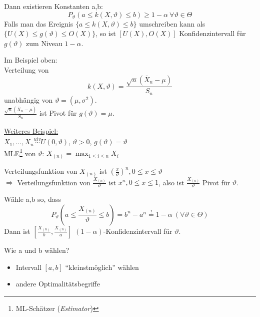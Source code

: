 \documentclass[a4paper,11pt,twoside,titlepage]{article}
\newcommand{\uiv}{\ensuremath{\stackrel{uiv}{\sim}}}
\begin{document}
Dann existieren Konstanten a,b:
\[P_\vartheta(a\leq k(X,\vartheta)\leq b)\geq1-\alpha\ \forall\vartheta\in\Theta\]
Falls man das Ereignis $\{a\leq k(X,\vartheta)\leq b\}$ umschreiben kann als $\{U(X)\leq g(\vartheta)\leq O(X)\}$, so ist $[U(X),O(X)]$ Konfidenzintervall für $g(\vartheta)$ zum Niveau $1-\alpha$.

Im Beispiel oben:\\
Verteilung von 
\[k(X,\vartheta)=\frac{\sqrt{n}(\bar X_n-\mu)}{S_n}\]
unabhängig von $\vartheta=(\mu,\sigma^2)$.\\
$\frac{\sqrt{n}(\bar X_n-\mu)}{S_n}$ ist Pivot für $g(\vartheta)=\mu$.

\underline{Weiteres Beispiel:}\\
$X_1,\ldots,X_n\uiv U(0,\vartheta)$, $\vartheta>0$, $g(\vartheta)=\vartheta$\\
MLE\footnote{ML-Schätzer (\textit{Estimator})} von $\vartheta$: $X_{(n)}=\max_{1\leq i\leq n}X_i$

Verteilungsfunktion von $X_{(n)}$ ist $(\frac{x}{\vartheta})^n, 0\leq x\leq \vartheta$\\
$\Rightarrow$ Verteilungsfunktion von $\frac{X_{(n)}}{\vartheta}$ ist $x^n, 0\leq x\leq 1$, also ist $\frac{X_{(n)}}{\vartheta}$ Pivot für $\vartheta$.

Wähle a,b so, dass 
\[P_\vartheta(a\leq \frac{X_{(n)}}{\vartheta}\leq b)=b^n-a^n\stackrel{!}{=}1-\alpha\ (\forall\vartheta\in\Theta)\]
Dann ist $[\frac{X_{(n)}}{b}, \frac{X_{(n)}}{a}]$ $(1-\alpha)$-Konfidenzintervall für $\vartheta$.

Wie a und b wählen?
\begin{itemize}
\item Intervall $[a,b]$ "`kleinstmöglich"' wählen
\item andere Optimalitätsbegriffe
\end{itemize}

\end{document}
